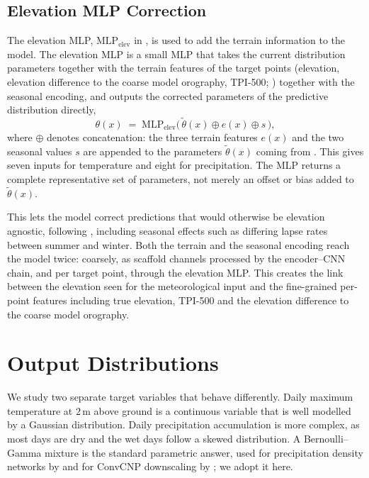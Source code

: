 \subsection{Elevation MLP Correction}\label{subsec:meth-elev-mlp}

The elevation MLP, $\mathrm{MLP}_{\mathrm{elev}}$ in , is used to add the terrain information to the model. The elevation MLP is a small MLP that takes the current distribution parameters together with the terrain features of the target points (elevation, elevation difference to the coarse model orography, TPI-500; ) together with the seasonal encoding, and outputs the corrected parameters of the predictive distribution directly,
\begin{equation}
    \theta(x) \;=\; \mathrm{MLP}_{\mathrm{elev}}\bigl(\,\tilde{\theta}(x) \oplus e(x) \oplus s\,\bigr),
\label{eq:elev-mlp}
\end{equation}
where $\oplus$ denotes concatenation: the three terrain features $e(x)$ and the two seasonal values $s$ are appended to the parameters $\tilde{\theta}(x)$ coming from . This gives seven inputs for temperature and eight for precipitation. The MLP returns a complete representative set of parameters, not merely an offset or bias added to $\tilde{\theta}(x)$.

This lets the model correct predictions that would otherwise be elevation agnostic, following \textcite{vaughan2022convcnp}, including seasonal effects such as differing lapse rates between summer and winter. Both the terrain and the seasonal encoding reach the model twice: coarsely, as scaffold channels processed by the encoder--CNN chain, and per target point, through the elevation MLP. This creates the link between the elevation seen for the meteorological input and the fine-grained per-point features including true elevation, TPI-500 and the elevation difference to the coarse model orography.

\section{Output Distributions}\label{sec:meth-distributions}

We study two separate target variables that behave differently. Daily maximum temperature at $2\,\mathrm{m}$ above ground is a continuous variable that is well modelled by a Gaussian distribution. Daily precipitation accumulation is more complex, as most days are dry and the wet days follow a skewed distribution. A Bernoulli--Gamma mixture is the standard parametric answer, used for precipitation density networks by \textcite{cannon2008berngamma} and for ConvCNP downscaling by \textcite{vaughan2022convcnp}; we adopt it here.

